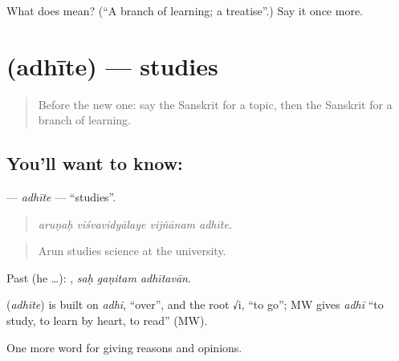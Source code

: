 \begin{tcolorbox}[breakable,colback=teal!4,colframe=teal!35!black,title={Before you move on}]
What does  mean? (\textquotedblleft{}A branch of learning; a treatise\textquotedblright{}.) Say it once more.
\end{tcolorbox}
\section[\texorpdfstring{\sk{अधीते} (adhīte)}{अधीते (adhīte)}]{ (adhīte) — studies}

\label{lesson:SA-C363-adhite}



\begin{quote}
Before the new one: say the Sanskrit for a topic, then the Sanskrit for a branch of learning.
\end{quote}

\subsection*{You'll want to know: }
\textbf{} — \emph{adhīte} — \textquotedblleft{}studies\textquotedblright{}.

\begin{quote}
   
\end{quote}

\begin{quote}
\emph{aruṇaḥ viśvavidyālaye vijñānam adhīte.}
\end{quote}

\begin{quote}
Arun studies science at the university.
\end{quote}

Past (he …):   , \emph{saḥ gaṇitam adhītavān}.

\begin{cousinweb}
\textbf{} (\emph{adhīte}) is built on \emph{adhi}, \textquotedblleft{}over\textquotedblright{}, and the root √i, \textquotedblleft{}to go\textquotedblright{}; MW gives \emph{adhī} \textquotedblleft{}to study, to learn by heart, to read\textquotedblright{} (MW).
\end{cousinweb}

\begin{grammarlens}[title={What you've built}]
One more word for giving reasons and opinions.
\end{grammarlens}

